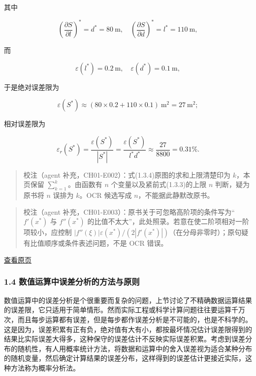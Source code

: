 \documentclass[
  10pt,
  fontset=fandol]{ctexart}
\begin{document}
其中

\[
\left(\frac{\partial S}{\partial l}\right)^*=d^*=80\ \mathrm{m},\quad
\left(\frac{\partial S}{\partial d}\right)^*=l^*=110\ \mathrm{m},
\]

而

\[
\varepsilon(l^*)=0.2\ \mathrm{m},\quad\varepsilon(d^*)=0.1\ \mathrm{m},
\]

于是绝对误差限为

\[
\varepsilon(S^*)\approx(80\times0.2+110\times0.1)\ \mathrm{m}^2=27\ \mathrm{m}^2;
\]

相对误差限为

\[
\varepsilon_r(S^*)=\frac{\varepsilon(S^*)}{|S^*|}=\frac{\varepsilon(S^*)}{l^*d^*}\approx\frac{27}{8800}=0.31\%.
\]

\begin{quote}
校注（agent 补充，CH01-E002）：式(1.3.4)原图的求和上限清楚印为 \(k\)，本页保留 \(\sum_{k=1}^{k}\)。由函数有 \(n\) 个变量以及紧前式(1.3.3)的上限 \(n\) 判断，疑为原书将 \(n\) 误排为 \(k\)。OCR 候选写成 \(n\)，不能据此静默改原书。
\end{quote}

\begin{quote}
校注（agent 补充，CH01-E003）：原书关于可忽略高阶项的条件写为``\(f'(x^*)\) 与 \(f''(x^*)\) 的比值不太大''，此处照录。若意在使二阶项相对一阶项较小，应控制 \(|f''(\xi)|\varepsilon(x^*)/(2|f'(x^*)|)\)（在分母非零时）；原句疑有比值顺序或条件表述问题，不是 OCR 错误。
\end{quote}

\href{../../source-images/pdf-022.jpeg}{查看原页}

\subsubsection{1.4 数值运算中误差分析的方法与原则}\label{ux6570ux503cux8fd0ux7b97ux4e2dux8befux5deeux5206ux6790ux7684ux65b9ux6cd5ux4e0eux539fux5219}

数值运算中的误差分析是个很重要而复杂的问题，上节讨论了不精确数据运算结果的误差限，它只适用于简单情形。然而实际工程或科学计算问题往往要运算千万次，而且每步运算都有误差，但是每步都作误差分析是不可能的，也是不科学的。这是因为，误差积累有正有负，绝对值有大有小，都按最坏情况估计误差限得到的结果比实际误差大得多，这种保守的误差估计不反映实际误差积累。考虑到误差分布的随机性，有人用概率统计方法，将数据和运算中的舍入误差视为适合某种分布的随机变量，然后确定计算结果的误差分布，这样得到的误差估计更接近实际，这种方法称为概率分析法。
\end{document}
